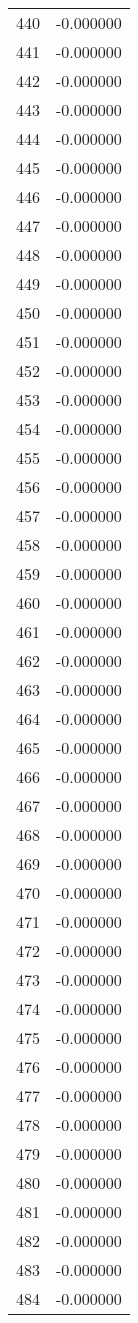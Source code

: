 \documentclass[12pt]{article}
\begin{document}
\begin{longtable}{@{}cc@{}}
440 & -0.000000 \\
441 & -0.000000 \\
442 & -0.000000 \\
443 & -0.000000 \\
444 & -0.000000 \\
445 & -0.000000 \\
446 & -0.000000 \\
447 & -0.000000 \\
448 & -0.000000 \\
449 & -0.000000 \\
450 & -0.000000 \\
451 & -0.000000 \\
452 & -0.000000 \\
453 & -0.000000 \\
454 & -0.000000 \\
455 & -0.000000 \\
456 & -0.000000 \\
457 & -0.000000 \\
458 & -0.000000 \\
459 & -0.000000 \\
460 & -0.000000 \\
461 & -0.000000 \\
462 & -0.000000 \\
463 & -0.000000 \\
464 & -0.000000 \\
465 & -0.000000 \\
466 & -0.000000 \\
467 & -0.000000 \\
468 & -0.000000 \\
469 & -0.000000 \\
470 & -0.000000 \\
471 & -0.000000 \\
472 & -0.000000 \\
473 & -0.000000 \\
474 & -0.000000 \\
475 & -0.000000 \\
476 & -0.000000 \\
477 & -0.000000 \\
478 & -0.000000 \\
479 & -0.000000 \\
480 & -0.000000 \\
481 & -0.000000 \\
482 & -0.000000 \\
483 & -0.000000 \\
484 & -0.000000 \\

\end{longtable}
\end{document}
